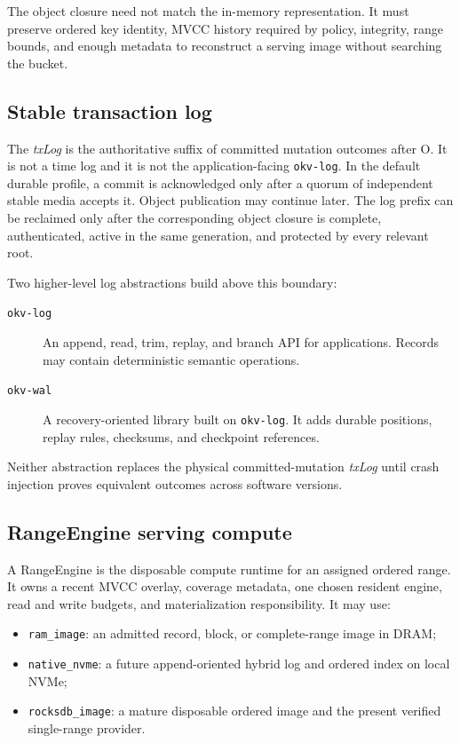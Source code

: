 \documentclass[sigconf,nonacm]{acmart}
\newcommand{\txlog}{\textit{txLog}}
\newcommand{\oversion}{O}
\begin{document}
The object closure need not match the in-memory representation. It must preserve
ordered key identity, MVCC history required by policy, integrity, range bounds,
and enough metadata to reconstruct a serving image without searching the
bucket.

\subsection{Stable transaction log}

The \txlog{} is the authoritative suffix of committed mutation outcomes after
\oversion{}. It is not a time log and it is not the application-facing
\texttt{okv-log}. In the default durable profile, a commit is acknowledged only
after a quorum of independent stable media accepts it. Object publication may
continue later. The log prefix can be reclaimed only after the corresponding
object closure is complete, authenticated, active in the same generation, and
protected by every relevant root.

Two higher-level log abstractions build above this boundary:

\begin{description}
  \item[\texttt{okv-log}] An append, read, trim, replay, and branch API for
  applications. Records may contain deterministic semantic operations.
  \item[\texttt{okv-wal}] A recovery-oriented library built on
  \texttt{okv-log}. It adds durable positions, replay rules, checksums, and
  checkpoint references.
\end{description}

Neither abstraction replaces the physical committed-mutation \txlog{} until
crash injection proves equivalent outcomes across software versions.

\subsection{RangeEngine serving compute}

A RangeEngine is the disposable compute runtime for an assigned ordered range.
It owns a recent MVCC overlay, coverage metadata, one chosen resident engine,
read and write budgets, and materialization responsibility. It may use:

\begin{itemize}
  \item \texttt{ram\_image}: an admitted record, block, or complete-range image
  in DRAM;
  \item \texttt{native\_nvme}: a future append-oriented hybrid log and ordered
  index on local NVMe;
  \item \texttt{rocksdb\_image}: a mature disposable ordered image and the
  present verified single-range provider.
\end{itemize}
\end{document}
